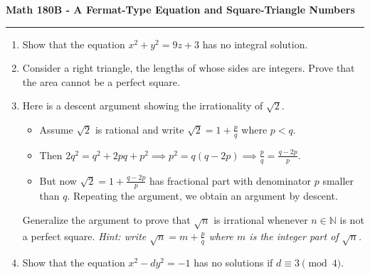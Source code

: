 \documentclass[11pt,letterpaper]{report}
\newcommand{\naturals}{\mathbb{N}}
\begin{document}
\begin{center}
{\bf \Large Math 180B - A Fermat-Type Equation and Square-Triangle Numbers}
\vspace{0.2cm}
\hrule
\end{center}

\begin{enumerate}
	\item Show that the equation $x^2+y^2 = 9z+3$ has no integral solution.

	\item Consider a right triangle, the lengths of whose sides are integers. Prove that the area cannot be a perfect square.

	\item Here is a descent argument showing the irrationality of $\sqrt{2}$.
	\begin{itemize}
		\item Assume $\sqrt{2}$ is rational and write $\sqrt{2} = 1+\frac{p}{q}$ where $p<q$.
		\item Then $2q^2 = q^2 + 2pq+p^2 \implies p^2 = q(q-2p)\implies \frac{p}{q} = \frac{q-2p}{p}$.
		\item But now $\sqrt{2} = 1+\frac{q-2p}{p}$ has fractional part with denominator $p$ smaller than $q$. Repeating the argument, we obtain an argument by descent.
	\end{itemize}
	Generalize the argument to prove that $\sqrt{n}$ is irrational whenever $n\in \naturals$ is not a perfect square. \textit{Hint: write $\sqrt{n} = m+\frac{p}{q}$ where $m$ is the integer part of $\sqrt{n}$.}

	\item Show that the equation $x^2-dy^2 = -1$ has no solutions if $d\equiv 3\pmod{4}$.


\end{enumerate}
\end{document}
